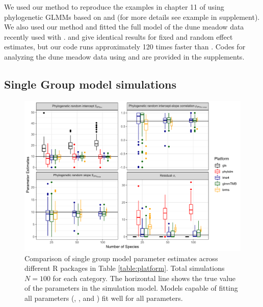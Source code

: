 \documentclass[12pt]{article}
\begin{document}
We used our method to reproduce the examples in chapter 11 of \cite{garamszegi2014modern} using phylogenetic GLMMs based on  and  (for more details see example in supplement).
We also used our method and fitted the full model of the dune meadow data recently used with  \citep{li2017canfun}. 
 and  give identical results for fixed and random effect estimates, but our code runs approximately 120 times faster than . 
Codes for analyzing the dune meadow data using  and  are provided in the supplements. 

\subsection*{Single Group model simulations}

\begin{center}
\begin{figure}[H]
  \includegraphics[scale=0.7,page=1]{./figure/ssplot.pdf}
  \caption{Comparison of single group model parameter estimates across different R packages in Table \ref{table:platform}. Total simulations $N=100$ for each category. The horizontal line shows the true value of the parameters in the simulation model. Models capable of fitting all parameters (,  , and ) fit well for all parameters. 
}
\label{ssplot}
\end{figure}
\end{center}
\end{document}
